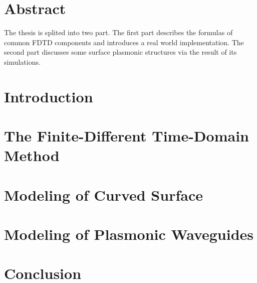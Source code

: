 \documentclass{book}
\begin{document}
\chapter*{Abstract}
The thesis is splited into two part. The first part describes the formulas of common FDTD components and introduces a real
world implementation. The second part discusses some surface plasmonic structures via the result of its simulations.

\tableofcontents


\chapter{Introduction}
\setcounter{page}{1}




\chapter{The Finite-Different Time-Domain Method}








\chapter{Modeling of Curved Surface}

\chapter{Modeling of Plasmonic Waveguides}

\chapter{Conclusion}
\end{document}
